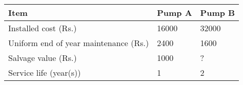 \begin{table}[H]
\centering
\begin{tabularx}{0.6\textwidth}{|l|X|X|}
\hline
\textbf{Item} & \textbf{Pump A} & \textbf{Pump B} \\
\hline
Installed cost (Rs.) & 16000 & 32000 \\
\hline
Uniform end of year maintenance (Rs.) & 2400 & 1600 \\
\hline
Salvage value (Rs.) & 1000 & ? \\
\hline
Service life (year(s)) & 1 & 2 \\
\hline
\end{tabularx}
\caption*{}
\end{table}